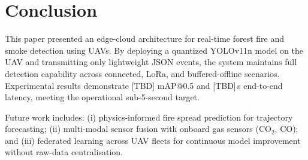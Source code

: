 \documentclass[conference]{IEEEtran}
\begin{document}
\section{Conclusion}
\label{sec:conclusion}

This paper presented an edge-cloud architecture for real-time forest
fire and smoke detection using UAVs. By deploying a quantized YOLOv11n
model on the UAV and transmitting only lightweight JSON events, the
system maintains full detection capability across connected, LoRa, and
buffered-offline scenarios. Experimental results demonstrate [TBD]
mAP@0.5 and [TBD]\,s end-to-end latency, meeting the operational
sub-5-second target.

Future work includes: (i) physics-informed fire spread prediction for
trajectory forecasting; (ii) multi-modal sensor fusion with onboard gas
sensors (CO$_2$, CO); and (iii) federated learning across UAV fleets
for continuous model improvement without raw-data centralisation.



\end{document}
